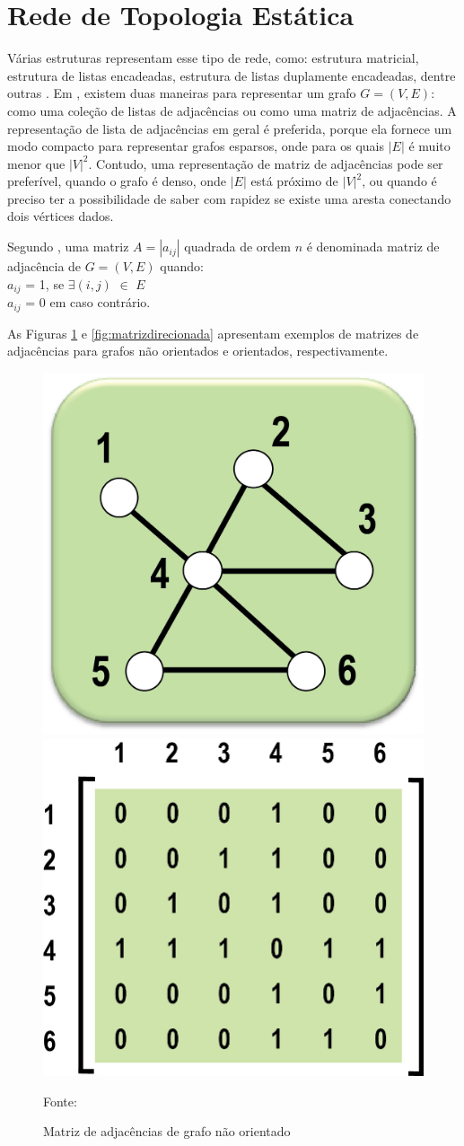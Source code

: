 \section{Rede de Topologia Estática}
Várias estruturas representam esse tipo de rede, como: estrutura matricial,
estrutura de listas encadeadas, estrutura de listas duplamente
encadeadas, dentre outras \cite{negreiros}.
Em  \cite{cormen}, existem duas maneiras para representar um grafo $G = (V,E)$:
como uma coleção de listas de adjacências ou como uma matriz de adjacências. A representação
de lista de adjacências em geral é preferida, porque ela fornece um modo compacto para representar grafos esparsos,
onde para os quais $|E|$ é muito menor que $|V|^2$. Contudo, uma representação de matriz de adjacências pode ser
preferível, quando o grafo é denso, onde $|E|$ está próximo de $|V|^2$, ou quando é preciso ter a possibilidade
de saber com rapidez se existe uma aresta conectando dois vértices dados.

Segundo \cite{goldbarg}, uma matriz $A = |a_{ij}|$ quadrada de ordem $n$ é denominada matriz de adjacência de $G = (V, E)$ quando:\\
\indent $a_{ij}$ = 1, se $\exists(i,j)$ $\in$ $E$\\
\indent $a_{ij}$ = 0 em caso contrário.

As Figuras \ref{fig:matriznaodirecionada} e \ref{fig:matrizdirecionada} apresentam exemplos de matrizes de adjacências para
grafos não orientados e orientados, respectivamente.

\begin{figure}[htbp]
\centering
 \includegraphics[width=.20\textwidth]{figuras/cal_fig_091a.jpg}
 \includegraphics[width=.25\textwidth]{figuras/cal_fig_091b.jpg}
\caption{Matriz de adjacências de grafo não orientado}
Fonte: \cite{goldbarg}
\label{fig:matriznaodirecionada}
\end{figure}


